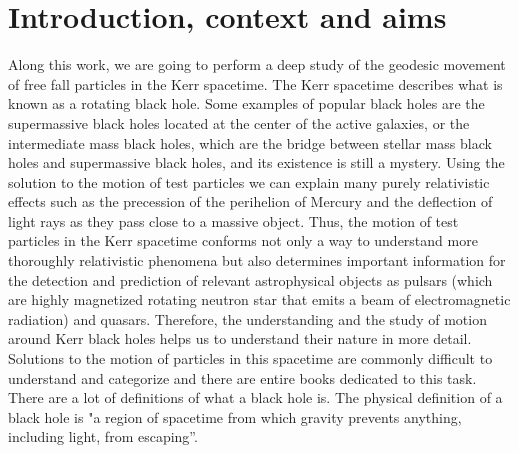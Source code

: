 \chapter{Introduction, context and aims}\label{ch:Intrd}

Along this work, we are going to perform a deep study of the geodesic movement of free fall particles in the Kerr spacetime. The Kerr spacetime describes what is known as a rotating black hole. Some examples of popular black holes are the supermassive black holes located at the center of the active galaxies, or the intermediate mass black holes, which are the bridge between stellar mass black holes and supermassive black holes, and its existence is still a mystery. Using the solution to the motion of test particles we can explain many purely relativistic effects such as the precession of the perihelion of Mercury and the deflection of light rays as they pass close to a massive object. Thus, the motion of test particles in the Kerr spacetime conforms not only a way to understand more thoroughly relativistic phenomena but also determines important information for the detection and prediction of relevant astrophysical objects as pulsars (which are highly magnetized rotating neutron star that emits a beam of electromagnetic radiation) and quasars. Therefore, the understanding and the study of motion around Kerr black holes helps us to understand their nature in more detail. Solutions to the motion of particles in this spacetime are commonly difficult to understand and categorize and there are entire books dedicated to this task. There are a lot of definitions of what a black hole is. The physical definition of a black hole is "a region of spacetime from which gravity prevents anything, including light, from escaping''.

